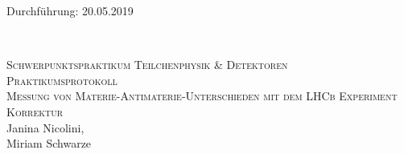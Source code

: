 



\begin{titlepage}
  \begin{flushleft}
 Durchführung: 20.05.2019
  \end{flushleft}


\HRule\\[1,0cm]

 \begin{center}

  \textsc{\Large Schwerpunktspraktikum Teilchenphysik \& Detektoren}\\[1.5cm]
\textsc{\LARGE Praktikumsprotokoll}\\[1.5cm]
\textsc{\huge Messung von Materie-Antimaterie-Unterschieden mit dem LHCb Experiment} \\[1cm]
\textsc{Korrektur} \\[5,5cm]

Janina Nicolini\footnotemark[1], \\
Miriam Schwarze\footnotemark[2] \\[1,0cm]



 \end{center}
\HRule

 \vfill

\end{titlepage}






\nocite{*}
\printbibliography


